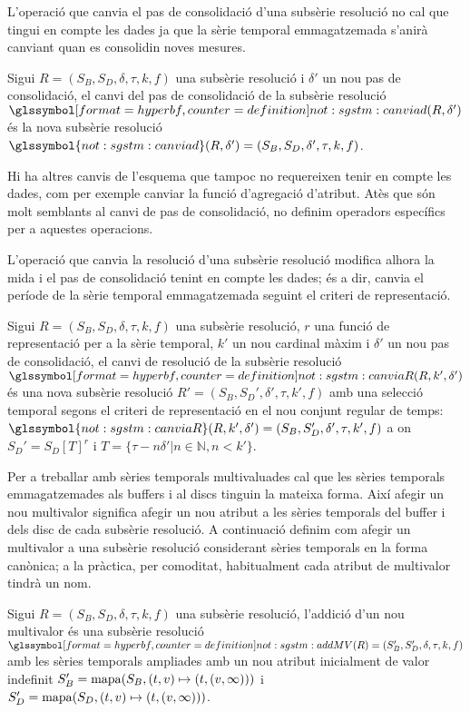 L'operació que canvia el pas de consolidació d'una subsèrie resolució
no cal que tingui en compte les dades ja que la sèrie temporal
emmagatzemada s'anirà canviant quan es consolidin noves mesures.
\begin{definition}
  Sigui $R = (S_B,S_D,\delta,\tau,k,f)$ una subsèrie resolució i
  $\delta'$ un nou pas de consolidació, el canvi del pas de
  consolidació de la subsèrie resolució
  $\glssymboldef{not:sgstm:canviad}(R,\delta')$ és la nova subsèrie resolució
  $\glssymbol{not:sgstm:canviad}(R,\delta')=(S_B,S_D,\delta',\tau,k,f)$.
\end{definition}

Hi ha altres canvis de l'esquema que tampoc no requereixen tenir en
compte les dades, com per exemple canviar la funció d'agregació
d'atribut. Atès que són molt semblants al canvi de pas de
consolidació, no definim operadors específics per a aquestes
operacions.


L'operació que canvia la resolució d'una subsèrie resolució modifica
alhora la mida i el pas de consolidació tenint en compte les dades; és
a dir, canvia el període de la sèrie temporal emmagatzemada seguint el
criteri de representació.
\begin{definition}
  Sigui $R = (S_B,S_D,\delta,\tau,k,f)$ una subsèrie resolució, $r$
  una funció de representació per a la sèrie temporal, $k'$ un nou
  cardinal màxim i $\delta'$ un nou pas de consolidació, el canvi de
  resolució de la subsèrie resolució
  $\glssymboldef{not:sgstm:canviaR}(R,k',\delta')$ és una nova subsèrie
  resolució $R' = (S_B,S_D',\delta',\tau,k',f)$ amb una selecció
  temporal segons el criteri de representació en el nou conjunt
  regular de temps:
  $\glssymbol{not:sgstm:canviaR}(R,k',\delta')=(S_B,S_D',\delta',\tau,k',f)$
  a on $S_D' = S_D[T]^r$ i $T=\{ \tau-n\delta' | n\in\mathbb{N},n<k'
  \}$.
\end{definition}


Per a treballar amb sèries temporals multivaluades cal que les sèries
temporals emmagatzemades als buffers i al discs tinguin la mateixa
forma. Així afegir un nou multivalor significa afegir un nou atribut a
les sèries temporals del buffer i dels disc de cada subsèrie
resolució. A continuació definim com afegir un multivalor a una
subsèrie resolució considerant sèries temporals en la forma canònica;
a la pràctica, per comoditat, habitualment cada atribut de multivalor
tindrà un nom.
\begin{definition}
  Sigui $R = (S_B,S_D,\delta,\tau,k,f)$ una subsèrie resolució,
  l'addició d'un nou multivalor és una subsèrie resolució
  $\glssymboldef{not:sgstm:addMV}(R) = (S_B',S_D',\delta,\tau,k,f)$ amb les
    sèries temporals ampliades amb un nou atribut inicialment de valor
    indefinit $S'_{B} = \operatorname*{mapa}(S_B,(t,v)\mapsto(t,(v,\infty)))$ i
    $S'_{D} = \operatorname*{mapa}(S_D,(t,v)\mapsto(t,(v,\infty)))$.
\end{definition}





